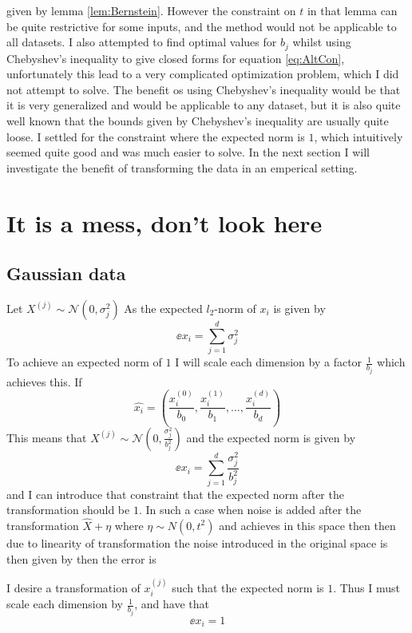 \documentclass[a4paper,12pt]{article}
\begin{document}
given by lemma \ref{lem:Bernstein}. However the constraint on $t$ in that lemma can be quite restrictive for some inputs, 
and the method would not be applicable to all datasets.
I also attempted to find optimal values for $b_j$ whilst using Chebyshev's inequality to give closed forms for equation \eqref{eq:AltCon}, 
unfortunately this lead to a very complicated optimization problem, which I did not attempt to solve.
The benefit os using Chebyshev's inequality would be that it is very generalized and would be applicable to any dataset, 
but it is also quite well known that the bounds given by Chebyshev's inequality are usually quite loose. 
I settled for the constraint where the expected norm is $1$, which intuitively seemed quite good and was much easier to solve. 
In the next section I will investigate the benefit of transforming the data in an emperical setting.





\newpage
\section{It is a mess, don't look here}
\subsection{Gaussian data}
Let $X^{(j)} \sim \mathcal{N}(0, \sigma_j^2)$ 
As the expected $l_2$-norm of $x_i$ is given by
\[
    \ee{x_i} = \sum_{j=1}^d \sigma_j^2
\]
To achieve an expected norm of $1$ I will scale 
each dimension by a factor $\frac{1}{b_j}$ which achieves this.
If 
\[
\hat{x_i} = \left( \frac{x_i^{(0)}}{b_0}, \frac{x_i^{(1)}}{b_1}, \dots, \frac{x_i^{(d)}}{b_d} \right)
\]
This means that $X^{(j)} \sim \mathcal{N}(0,\frac{\sigma_j^2}{b_j^2})$ 
and the expected norm is given by 
\[
    \ee{x_i} = \sum_{j=1}^d \frac{\sigma_j^2}{b_j^2}
\]
and I can introduce that constraint that the expected norm
after the transformation should be $1$.
In such a case when noise is added after the transformation
$\hat{X} + \eta$
where $\eta \sim N(0, t^2)$ and achieves \edp in this space
then then due to linearity of transformation the noise 
introduced in the original space is then given by
then the error is





I desire a transformation of $x_i^{(j)}$ such that the 
expected norm is $1$. Thus I must scale each dimension by
$\frac{1}{b_j}$, and have that 
\[
    \ee{x_i} = 1
\]
\end{document}
